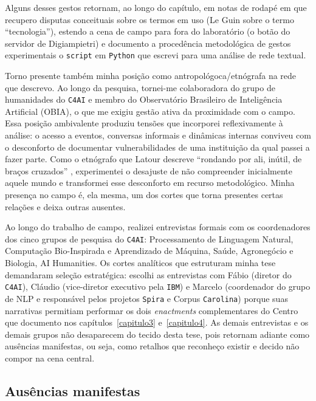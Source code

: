 Alguns desses gestos retornam, ao longo do capítulo, em notas de rodapé em que recupero disputas conceituais sobre os termos em uso (Le Guin sobre o termo \enquote{tecnologia}), estendo a cena de campo para fora do laboratório (o botão do servidor de Digiampietri) e documento a procedência metodológica de gestos experimentais o \texttt{script} em \texttt{Python} que escrevi para uma análise de rede textual.

Torno presente também minha posição como antropológoca/etnógrafa na rede que descrevo. Ao longo da pesquisa, tornei-me colaboradora do grupo de humanidades do \texttt{C4AI} e membro do Observatório Brasileiro de Inteligência Artificial (OBIA), o que me exigiu gestão ativa da proximidade com o campo. Essa posição ambivalente produziu tensões que incorporei reflexivamente à análise: o acesso a eventos, conversas informais e dinâmicas internas conviveu com o desconforto de documentar vulnerabilidades de uma instituição da qual passei a fazer parte. Como o etnógrafo que Latour descreve \enquote{rondando por ali, inútil, de braços cruzados} \parencite[p.~62]{Latour2017Esperanca}, experimentei o desajuste de não compreender inicialmente aquele mundo e transformei esse desconforto em recurso metodológico. Minha presença no campo é, ela mesma, um dos cortes que torna presentes certas relações e deixa outras ausentes.

Ao longo do trabalho de campo, realizei entrevistas formais com os coordenadores dos cinco grupos de pesquisa do \texttt{C4AI}: Processamento de Linguagem Natural, Computação Bio-Inspirada e Aprendizado de Máquina, Saúde, Agronegócio e Biologia, AI Humanities. Os cortes analíticos que estruturam minha tese demandaram seleção estratégica: escolhi as entrevistas com Fábio (diretor do \texttt{C4AI}), Cláudio (vice-diretor executivo pela \texttt{IBM}) e Marcelo (coordenador do grupo de NLP e responsável pelos projetos \texttt{Spira} e Corpus \texttt{Carolina}) porque suas narrativas permitiam performar os dois \textit{enactments} complementares do Centro que documento nos capítulos~\ref{capitulo3} e~\ref{capitulo4}. As demais entrevistas e os demais grupos não desaparecem do tecido desta tese, pois retornam adiante como ausências manifestas, ou seja, como retalhos que reconheço existir e decido não compor na cena central.

\subsection{Ausências manifestas}

